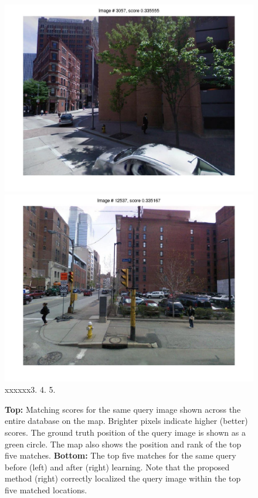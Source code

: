 \documentclass[10pt,onecolumn,A4]{article}
\begin{document}
\begin{figure}
\begin{minipage}{0.45\linewidth}
		\colorbox{myCopper4}{\includegraphics[trim = 55mm 40mm 55mm 30mm, clip=true,width=0.30\linewidth]{sup1383/svm04.jpg}}
		\colorbox{myCopper5}{\includegraphics[trim = 55mm 40mm 55mm 30mm, clip=true,width=0.30\linewidth]{sup1383/svm05.jpg}}  \\
		\textcolor{myWhite}{xxxxxx}3. \hspace{0.25\linewidth}4. \hspace{0.25\linewidth}5. \\
	\end{minipage}
	\caption{{\bf Top:} 
	Matching scores for the same query image shown across the entire database on the map. Brighter pixels indicate higher (better) scores. The ground truth position of the query image is shown as a green circle. The map also shows the position and rank of the top five matches. {\bf Bottom:} The top five matches for the same query before (left) and after (right) learning.
	Note that the proposed method (right) correctly localized the query image within the top five matched locations. 
}
\end{figure}
\end{document}
